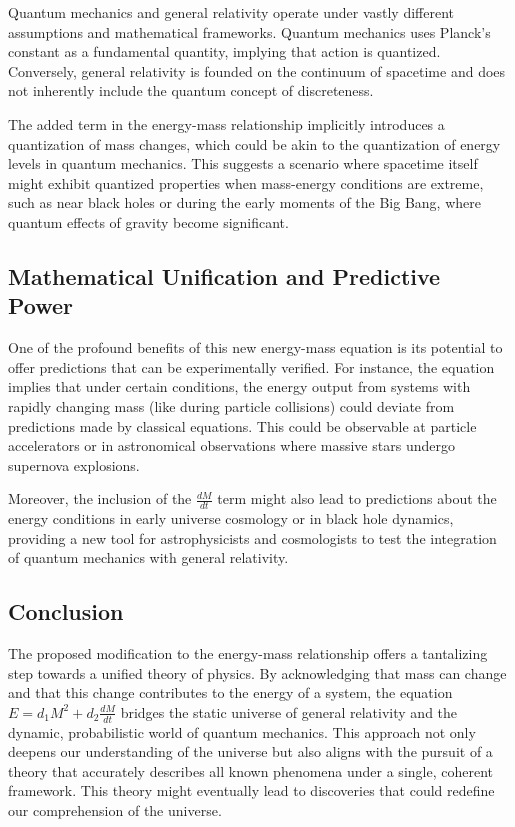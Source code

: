 \documentclass{article}
\begin{document}
Quantum mechanics and general relativity operate under vastly different assumptions and mathematical frameworks. Quantum mechanics uses Planck's constant as a fundamental quantity, implying that action is quantized. Conversely, general relativity is founded on the continuum of spacetime and does not inherently include the quantum concept of discreteness.

The added term in the energy-mass relationship implicitly introduces a quantization of mass changes, which could be akin to the quantization of energy levels in quantum mechanics. This suggests a scenario where spacetime itself might exhibit quantized properties when mass-energy conditions are extreme, such as near black holes or during the early moments of the Big Bang, where quantum effects of gravity become significant.

\subsection*{Mathematical Unification and Predictive Power}

One of the profound benefits of this new energy-mass equation is its potential to offer predictions that can be experimentally verified. For instance, the equation implies that under certain conditions, the energy output from systems with rapidly changing mass (like during particle collisions) could deviate from predictions made by classical equations. This could be observable at particle accelerators or in astronomical observations where massive stars undergo supernova explosions.

Moreover, the inclusion of the \(\frac{dM}{dt}\) term might also lead to predictions about the energy conditions in early universe cosmology or in black hole dynamics, providing a new tool for astrophysicists and cosmologists to test the integration of quantum mechanics with general relativity.

\subsection*{Conclusion}

The proposed modification to the energy-mass relationship offers a tantalizing step towards a unified theory of physics. By acknowledging that mass can change and that this change contributes to the energy of a system, the equation \(E = d_1 M^2 + d_2 \frac{dM}{dt}\) bridges the static universe of general relativity and the dynamic, probabilistic world of quantum mechanics. This approach not only deepens our understanding of the universe but also aligns with the pursuit of a theory that accurately describes all known phenomena under a single, coherent framework. This theory might eventually lead to discoveries that could redefine our comprehension of the universe.
\end{document}
